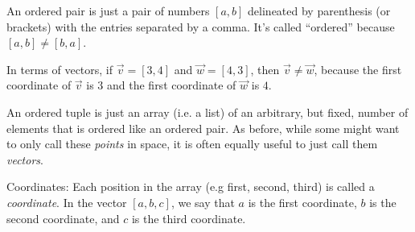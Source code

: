 \documentclass{ximera}
\begin{document}
\begin{definition}\label{def:orderedpairs}
    An ordered pair is just a pair of numbers $[a,b]$ delineated by parenthesis (or brackets) with the entries separated by a comma. It's called ``ordered'' because $[a,b] \ne [b,a]$. 
    
\begin{example}

      In terms of vectors, if $\vec{v}=[3,4]$ and $\vec{w}=[4,3]$, then $\vec{v}\ne \vec{w}$, because the first coordinate of $\vec{v}$ is $3$ and the first coordinate of $\vec{w}$ is $4$.

\end{example}
    
    \item[An ordered tuple] is just an array (i.e. a list) of an arbitrary, but fixed, number of elements that is ordered like an ordered pair. As before, while some might want to only call these \emph{points} in space, it is often equally useful to just call them \emph{vectors}.
    
    \item[Coordinates:] Each position in the array (e.g first, second, third) is called a \textit{coordinate}. In the vector $[a, b, c]$, we say that $a$ is the first coordinate, $b$ is the second coordinate, and $c$ is the third coordinate. 

\end{definition}
\end{document}
